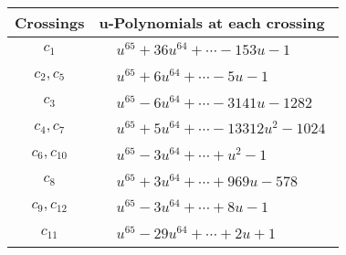 \documentclass[1p]{elsarticle_modified}
\theoremstyle{definition}
\begin{document}
\begin{tabular}{m{50pt}|m{274pt}}
Crossings & \hspace{64pt}u-Polynomials at each crossing \\
\hline $$\begin{aligned}c_{1}\end{aligned}$$&$\begin{aligned}
&u^{65}+36 u^{64}+\cdots-153 u-1
\end{aligned}$\\
\hline $$\begin{aligned}c_{2},c_{5}\end{aligned}$$&$\begin{aligned}
&u^{65}+6 u^{64}+\cdots-5 u-1
\end{aligned}$\\
\hline $$\begin{aligned}c_{3}\end{aligned}$$&$\begin{aligned}
&u^{65}-6 u^{64}+\cdots-3141 u-1282
\end{aligned}$\\
\hline $$\begin{aligned}c_{4},c_{7}\end{aligned}$$&$\begin{aligned}
&u^{65}+5 u^{64}+\cdots-13312 u^2-1024
\end{aligned}$\\
\hline $$\begin{aligned}c_{6},c_{10}\end{aligned}$$&$\begin{aligned}
&u^{65}-3 u^{64}+\cdots+u^2-1
\end{aligned}$\\
\hline $$\begin{aligned}c_{8}\end{aligned}$$&$\begin{aligned}
&u^{65}+3 u^{64}+\cdots+969 u-578
\end{aligned}$\\
\hline $$\begin{aligned}c_{9},c_{12}\end{aligned}$$&$\begin{aligned}
&u^{65}-3 u^{64}+\cdots+8 u-1
\end{aligned}$\\
\hline $$\begin{aligned}c_{11}\end{aligned}$$&$\begin{aligned}
&u^{65}-29 u^{64}+\cdots+2 u+1
\end{aligned}$\\
\hline
\end{tabular}\\~\\
\end{document}
